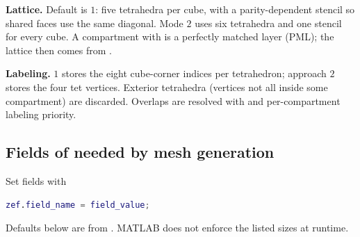 \textbf{Lattice.} Default  is \(1\): five
tetrahedra per cube, with a parity-dependent stencil so shared faces use the
same diagonal. Mode \(2\) uses six tetrahedra and one stencil for every cube.
A compartment with  is a perfectly matched layer
(PML); the lattice then comes from .

\textbf{Labeling.}  \(1\) stores the eight
cube-corner indices per tetrahedron; approach \(2\) stores the four tet
vertices. Exterior tetrahedra (vertices not all inside some compartment) are
discarded. Overlaps are resolved with  and
per-compartment labeling priority.

\subsection{Fields of  needed by mesh generation}%
\label{ssec:meshing-fields}

Set fields with
\begin{lstlisting}[style=unnumberedlines, language=Matlab]
zef.field_name = field_value;
\end{lstlisting}
Defaults below are from . MATLAB does not
enforce the listed sizes at runtime.








